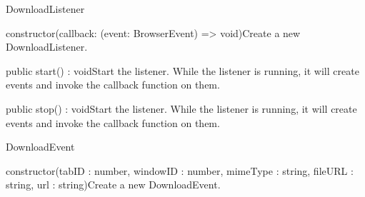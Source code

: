 \begin{class}{DownloadListener}



\begin{constructors}
\begin{constructor}{constructor(callback: (event: BrowserEvent) => void)}{Create a new DownloadListener.}
\begin{parameters}
\end{parameters}
\end{constructor}
\end{constructors}
\begin{methods}
\begin{method}{public start() : void}{Start the listener. While the listener is running, it will create events and invoke the callback function on them.}
\end{method}
\begin{method}{public stop() : void}{Start the listener. While the listener is running, it will create events and invoke the callback function on them.}
\end{method}
\end{methods}
\end{class}

\begin{class}{DownloadEvent}



\begin{constructors}
\begin{constructor}{constructor(tabID : number, windowID : number, mimeType : string, fileURL : string, url : string)}{Create a new DownloadEvent.}
\begin{parameters}
\end{parameters}
\end{constructor}
\end{constructors}
\end{class}

